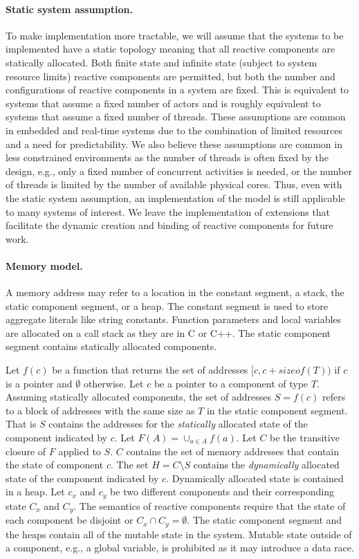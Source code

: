 \paragraph{Static system assumption.}
To make implementation more tractable, we will assume that the systems to be implemented have a static topology meaning that all reactive components are statically allocated.
Both finite state and infinite state (subject to system resource limits) reactive components are permitted, but both the number and configurations of reactive components in a system are fixed.
This is equivalent to systems that assume a fixed number of actors and is roughly equivalent to systems that assume a fixed number of threads.
These assumptions are common in embedded and real-time systems due to the combination of limited resources and a need for predictability.
We also believe these assumptions are common in less constrained environments as the number of threads is often fixed by the design, e.g., only a fixed number of concurrent activities is needed, or the number of threads is limited by the number of available physical cores.
Thus, even with the static system assumption, an implementation of the model is still applicable to many systems of interest.
We leave the implementation of extensions that facilitate the dynamic creation and binding of reactive components for future work.

\paragraph{Memory model.}
A memory address may refer to a location in the constant segment, a stack, the static component segment, or a heap.
The constant segment is used to store aggregate literals like string constants.
Function parameters and local variables are allocated on a call stack as they are in C or C++.
The static component segment contains statically allocated components.

Let $f(c)$ be a function that returns the set of addresses $[c,c+sizeof(T))$ if $c$ is a pointer and $\emptyset$ otherwise.
Let $c$ be a pointer to a component of type $T$.
Assuming statically allocated components, the set of addresses $S = f(c)$ refers to a block of addresses with the same size as $T$ in the static component segment.
That is $S$ contains the addresses for the \emph{statically} allocated state of the component indicated by $c$.
Let $F(A) = \cup_{a \in A} f(a)$.
Let $C$ be the transitive closure of $F$ applied to $S$.
$C$ contains the set of memory addresses that contain the state of component $c$.
The set $H = C \setminus S$ contains the \emph{dynamically} allocated state of the component indicated by $c$.
Dynamically allocated state is contained in a heap.
Let $c_x$ and $c_y$ be two different components and their corresponding state $C_x$ and $C_y$.
The semantics of reactive components require that the state of each component be disjoint or $C_x \cap C_y = \emptyset$.
The static component segment and the heaps contain all of the mutable state in the system.
Mutable state outside of a component, e.g., a global variable, is prohibited as it may introduce a data race.

